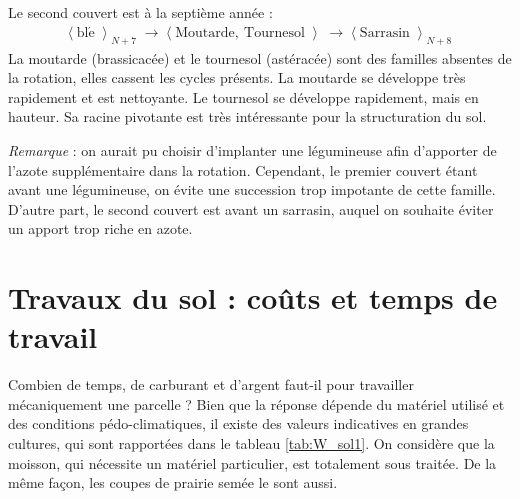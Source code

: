 \documentclass{book}
\begin{document}
Le second couvert est à la septième année :
\begin{align*}
\left\langle \right. \mathrm{bl\acute{e}}  \left\rangle \right._{N+7}  \longrightarrow \left\langle \right.\mathrm{Moutarde,\ Tournesol}\left\rangle \right.\longrightarrow \left\langle \right. \mathrm{Sarrasin} \left\rangle \right. _{N+8}
\end{align*}
La moutarde (brassicacée) et le tournesol (astéracée) sont des familles absentes de la rotation, elles cassent les cycles présents. La moutarde se développe très rapidement et est nettoyante. Le tournesol se développe rapidement, mais en hauteur. Sa racine pivotante est très intéressante pour la structuration du sol.

\textit{Remarque} : on aurait pu choisir d'implanter une légumineuse afin d'apporter de l'azote supplémentaire dans la rotation. Cependant, le premier couvert étant avant une légumineuse, on évite une succession trop impotante de cette famille. D'autre part, le second couvert est avant un sarrasin, auquel on souhaite éviter un apport trop riche en azote.

\section{Travaux du sol : coûts et temps de travail}
\label{part:W_sol}

Combien de temps, de carburant et d'argent faut-il pour travailler mécaniquement une parcelle ? Bien que la réponse dépende du matériel utilisé et des conditions pédo-climatiques, il existe des valeurs indicatives en grandes cultures, qui sont rapportées dans le tableau \ref{tab:W_sol1}. On considère que la moisson, qui nécessite un matériel particulier, est totalement sous traitée. De la même façon, les coupes de prairie semée le sont aussi.
\end{document}
